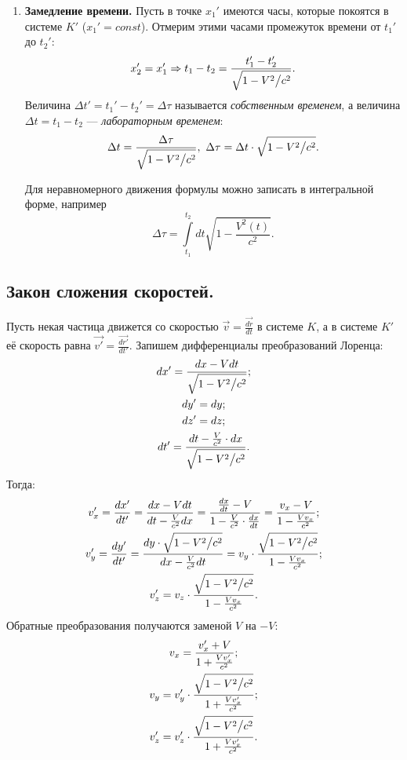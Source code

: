 \begin{enumerate}
    \item {\bf Замедление времени.} Пусть в точке $x_1'$ имеются часы, которые покоятся в системе $K'$ ($x_1' = const$). Отмерим этими часами промежуток времени от $t_1'$ до $t_2'$:
        \[
            x_2' = x_1' \Rightarrow t_1 - t_2 = \frac{t_1' - t_2'}{\sqrt{1 - V^2 \big/ c^2}}.
        \]
        Величина $\Delta t' = t_1' - t_2' = \Delta \tau$ называется {\it собственным временем}, а величина $\Delta t = t_1 - t_2$ --- {\it лабораторным временем}:
        \[
            \Delta t = \frac{\Delta \tau}{\sqrt{1 - V^2 \big/ c^2}}, \ \Delta \tau = \Delta t \cdot \sqrt{1 - V^2 \big/ c^2}.
        \]
        \begin{note}
            Для неравномерного движения формулы можно записать в интегральной форме, например
            \[
                \Delta \tau = \int\limits_{t_1}^{t_2} dt \sqrt{1 - \frac{V^2(t)}{c^2}}.
            \]
        \end{note}
\end{enumerate}

\subsection{Закон сложения скоростей.}
    Пусть некая частица движется со скоростью $\vec{v} = \frac{\vec{dr}}{dt}$ в системе $K$, а в системе $K'$ её скорость равна $\vec{v'} = \frac{\vec{dr'}}{dt'}$. Запишем дифференциалы преобразований Лоренца:
    \begin{gather*}
        dx' = \frac{dx - V dt}{\sqrt{1 - V^2 \big/ c^2}}; \\
        dy' = dy; \\
        dz' = dz; \\
        dt' = \frac{dt - \frac{V}{c^2} \cdot dx}{\sqrt{1 - V^2 \big/ c^2}}.
    \end{gather*}
    Тогда:
    \begin{gather*}
        v_x' = \frac{dx'}{dt'} = \frac{dx - V dt}{dt - \frac{V}{c^2} dx} = \frac{\frac{dx}{dt} - V}{1 - \frac{V}{c^2}\cdot\frac{dx}{dt}} = \frac{v_x - V}{1 - \frac{V v_x}{c^2}}; \\
        v_y' = \frac{dy'}{dt'} = \frac{dy \cdot \sqrt{1 - V^2 \big/ c^2}}{dx - \frac{V}{c^2}dt} = v_y \cdot \frac{\sqrt{1 - V^2 \big/ c^2}}{1 - \frac{V v_x}{c^2}}; \\
        v_z' = v_z \cdot \frac{\sqrt{1 - V^2 \big/ c^2}}{1 - \frac{V v_x}{c^2}}.
    \end{gather*}
    Обратные преобразования получаются заменой $V$ на $-V$:
    \begin{gather*}
        v_x = \frac{v_x' + V}{1 + \frac{V v_x'}{c^2}}; \\
        v_y = v_y' \cdot \frac{\sqrt{1 - V^2 \big/ c^2}}{1 + \frac{V v_x'}{c^2}}; \\
        v_z' = v_z' \cdot \frac{\sqrt{1 - V^2 \big/ c^2}}{1 + \frac{V v_x'}{c^2}}.
    \end{gather*}

